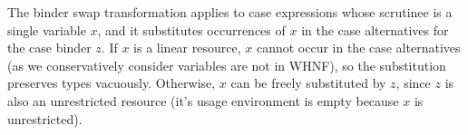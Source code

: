 \documentclass[acmsmall,review,screen]{acmart}
\begin{document}
The binder swap transformation applies to case expressions whose scrutinee is a
single variable $x$, and it substitutes occurrences of $x$ in the case
alternatives for the case binder $z$. If $x$ is a linear resource, $x$ cannot
occur in the case alternatives (as we conservatively consider variables are not
in WHNF), so the substitution preserves types vacuously. Otherwise, $x$ can be
freely substituted by $z$, since $z$ is also an unrestricted resource (it's
usage environment is empty because $x$ is unrestricted).


















\end{document}

